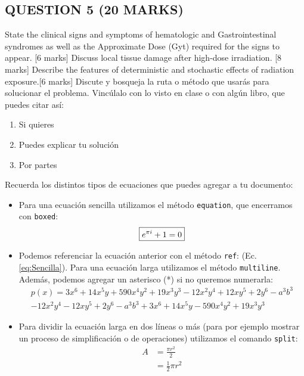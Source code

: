 \documentclass{assignment}
\begin{document}
\begin{problem}
{\subsection{QUESTION 5 (20 MARKS)}
 State the clinical signs and symptoms of hematologic and Gastrointestinal syndromes as
well as the Approximate Dose (Gyt) required for the signs to appear. [6 marks]
 Discuss local tissue damage after high-dose irradiation. [8 marks]
 Describe the features of deterministic and stochastic effects of radiation exposure.[6 marks]
\noindent Discute y bosqueja la ruta o método que usarás para solucionar el problema. Vincúlalo con lo visto en clase o con algún libro, que puedes citar así: \cite{GustavoLopez}

\begin{enumerate}
    \item Si quieres

    \item Puedes explicar tu solución

    \item Por partes
\end{enumerate}

\noindent Recuerda los distintos tipos de ecuaciones que puedes agregar a tu documento:

\begin{itemize}
    \item Para una ecuación sencilla utilizamos el método \texttt{equation}, que encerramos con \texttt{boxed}:
    \begin{equation}\label{eq:Sencilla}
        \boxed{             %
        e^{\pi i} + 1 = 0
        }
    \end{equation}

    \item Podemos referenciar la ecuación anterior con el método \texttt{ref}: (Ec. \ref{eq:Sencilla}). Para una ecuación larga utilizamos el método \texttt{multiline}. Además, podemos agregar un asterisco (*) si no queremos numerarla:
    \begin{multline*}
        p(x) = 3x^6 + 14x^5y + 590x^4y^2 + 19x^3y^3 - 12x^2y^4 + 12xy^5 + 2y^6 - a^3b^3\\ 
            - 12x^2y^4 - 12xy^5 + 2y^6 - a^3b^3 + 3x^6 + 14x^5y - 590x^4y^2 + 19x^3y^3
    \end{multline*}

    \item Para dividir la ecuación larga en dos líneas o más (para por ejemplo mostrar un proceso de simplificación o de operaciones) utilizamos el comando \texttt{split}:
    \begin{equation} \label{eq1}
        \begin{split}
            A & = \frac{\pi r^2}{2} \\
             & = \frac{1}{2} \pi r^2
        \end{split}
    \end{equation}


\end{itemize}}
\end{problem}
\end{document}
